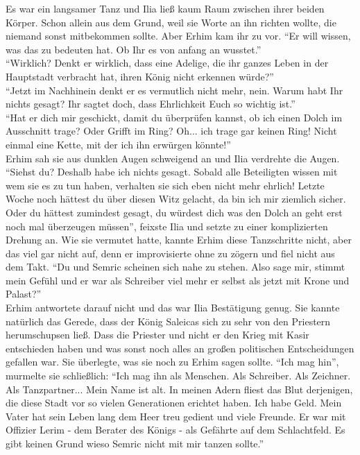 Es war ein langsamer Tanz und Ilia ließ kaum Raum zwischen ihrer beiden Körper. Schon allein aus 
dem Grund, weil sie Worte an ihn richten wollte, die niemand sonst mitbekommen sollte. Aber Erhim 
kam ihr zu vor. ``Er will wissen, was das zu bedeuten hat. Ob Ihr es von anfang an wusstet.''\\
``Wirklich? Denkt er wirklich, dass eine Adelige, die ihr ganzes Leben in der Hauptstadt verbracht 
hat, ihren König nicht erkennen würde?''\\
``Jetzt im Nachhinein denkt er es vermutlich nicht mehr, nein. Warum habt Ihr nichts gesagt? Ihr 
sagtet doch, dass Ehrlichkeit Euch so wichtig ist.''\\
``Hat er dich mir geschickt, damit du überprüfen kannst, ob ich einen Dolch im Ausschnitt trage? 
Oder Grifft im Ring? Oh... ich trage gar keinen Ring! Nicht einmal eine Kette, mit der ich ihn 
erwürgen könnte!''\\
Erhim sah sie aus dunklen Augen schweigend an und Ilia verdrehte die Augen. ``Siehst du? Deshalb 
habe ich nichts gesagt. Sobald alle Beteiligten wissen mit wem sie es zu tun haben, verhalten sie 
sich eben nicht mehr ehrlich! Letzte Woche noch hättest du über diesen Witz gelacht, da bin ich mir 
ziemlich sicher. Oder du hättest zumindest gesagt, du würdest dich was den Dolch an geht erst noch 
mal überzeugen müssen'', feixste Ilia und setzte zu einer komplizierten Drehung an. Wie sie 
vermutet hatte, kannte Erhim diese Tanzschritte nicht, aber das viel gar nicht auf, denn er 
improvisierte ohne zu zögern und fiel nicht aus dem Takt. ``Du und Semric scheinen sich nahe zu 
stehen. Also sage mir, stimmt mein Gefühl und er war als Schreiber viel mehr er selbst als 
jetzt mit Krone und Palast?''\\
Erhim antwortete darauf nicht und das war Ilia Bestätigung genug. Sie kannte natürlich das Gerede, 
dass der König Saleicas sich zu sehr von den Priestern herumschupsen ließ. Dass die Priester und 
nicht er den Krieg mit Kasir entschieden haben und was sonst noch alles an großen politischen 
Entscheidungen gefallen war. Sie überlegte, was sie noch zu Erhim sagen sollte. ``Ich mag hin'', 
murmelte sie schließlich: ``Ich mag ihn als Menschen. Als Schreiber. Als Zeichner. Als 
Tanzpartner... Mein Name ist alt. In meinen Adern fliest das Blut derjenigen, die diese Stadt vor 
so vielen Generationen erichtet haben. Ich habe Geld. Mein Vater hat sein Leben lang dem Heer treu 
gedient und viele Freunde. Er war mit Offizier Lerim - dem Berater des Königs - als Gefährte auf 
dem Schlachtfeld. Es gibt keinen Grund wieso Semric nicht mit mir tanzen sollte.''\\
